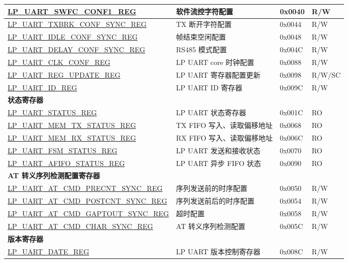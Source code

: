 \begin{longtable}{ | p{6.8cm} | p{5.7cm} | p{1.3cm} | p{1.7cm} | }
\hyperref[regdesc:LPUARTSWFCCONF1REG]{LP\_UART\_SWFC\_CONF1\_REG} & 软件流控字符配置 & 0x0040 & R/W \\ \hline
\hyperref[regdesc:LPUARTTXBRKCONFSYNCREG]{LP\_UART\_TXBRK\_CONF\_SYNC\_REG} & TX 断开字符配置 & 0x0044 & R/W \\ \hline
\hyperref[regdesc:LPUARTIDLECONFSYNCREG]{LP\_UART\_IDLE\_CONF\_SYNC\_REG} & 帧结束空闲配置 & 0x0048 & R/W \\ \hline
\hyperref[regdesc:LPUARTDELAYCONFSYNCREG]{LP\_UART\_DELAY\_CONF\_SYNC\_REG} & RS485 模式配置 & 0x004C & R/W \\ \hline
\hyperref[regdesc:LPUARTCLKCONFREG]{LP\_UART\_CLK\_CONF\_REG} & LP UART core 时钟配置 & 0x0088 & R/W \\ \hline
\hyperref[regdesc:LPUARTREGUPDATEREG]{LP\_UART\_REG\_UPDATE\_REG} & LP UART 寄存器配置更新 & 0x0098 & R/W/SC \\ \hline
\hyperref[regdesc:LPUARTIDREG]{LP\_UART\_ID\_REG} & LP UART ID 寄存器 & 0x009C & R/W \\ \hline
\multicolumn{4}{|l|}{\textbf{状态寄存器}} \\ \hline
\hyperref[regdesc:LPUARTSTATUSREG]{LP\_UART\_STATUS\_REG} & LP UART 状态寄存器 & 0x001C & RO \\ \hline
\hyperref[regdesc:LPUARTMEMTXSTATUSREG]{LP\_UART\_MEM\_TX\_STATUS\_REG} & TX FIFO 写入、读取偏移地址 & 0x0068 & RO \\ \hline
\hyperref[regdesc:LPUARTMEMRXSTATUSREG]{LP\_UART\_MEM\_RX\_STATUS\_REG} & RX FIFO 写入、读取偏移地址 & 0x006C & RO \\ \hline
\hyperref[regdesc:LPUARTFSMSTATUSREG]{LP\_UART\_FSM\_STATUS\_REG} & LP UART 发送和接收状态 & 0x0070 & RO \\ \hline
\hyperref[regdesc:LPUARTAFIFOSTATUSREG]{LP\_UART\_AFIFO\_STATUS\_REG} & LP UART 异步 FIFO 状态 & 0x0090 & RO \\ \hline
\multicolumn{4}{|l|}{\textbf{AT 转义序列检测配置寄存器}} \\ \hline
\hyperref[regdesc:LPUARTATCMDPRECNTSYNCREG]{LP\_UART\_AT\_CMD\_PRECNT\_SYNC\_REG} & 序列发送前的时序配置 & 0x0050 & R/W \\ \hline
\hyperref[regdesc:LPUARTATCMDPOSTCNTSYNCREG]{LP\_UART\_AT\_CMD\_POSTCNT\_SYNC\_REG} & 序列发送前后的时序配置 & 0x0054 & R/W \\ \hline
\hyperref[regdesc:LPUARTATCMDGAPTOUTSYNCREG]{LP\_UART\_AT\_CMD\_GAPTOUT\_SYNC\_REG} & 超时配置 & 0x0058 & R/W \\ \hline
\hyperref[regdesc:LPUARTATCMDCHARSYNCREG]{LP\_UART\_AT\_CMD\_CHAR\_SYNC\_REG} & AT 转义序列检测配置 & 0x005C & R/W \\ \hline
\multicolumn{4}{|l|}{\textbf{版本寄存器}} \\ \hline
\hyperref[regdesc:LPUARTDATEREG]{LP\_UART\_DATE\_REG} & LP UART 版本控制寄存器 & 0x008C & R/W \\ \hline

\end{longtable}

